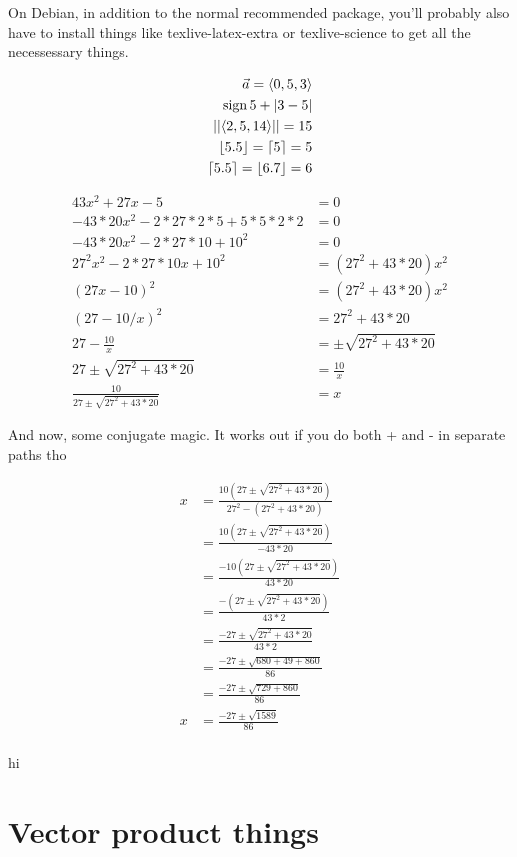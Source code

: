 \documentclass{article}
\DeclareMathOperator{\sgn}{sign}
\DeclarePairedDelimiter\abs{\lvert}{\rvert}
\DeclarePairedDelimiter\magn{\lvert\lvert}{\rvert\rvert}
\DeclarePairedDelimiter\ceil{\lceil}{\rceil}
\DeclarePairedDelimiter\floor{\lfloor}{\rfloor}
\DeclarePairedDelimiter\vecnum{\langle}{\rangle}
\begin{document}
On Debian, in addition to the normal recommended package, you'll probably also have to install things like texlive-latex-extra or texlive-science to get all the necessessary things.

\begin{align*}
  \vec a=\vecnum{0,5,3}\\
  \sgn 5+\abs{3-5}\\
  \magn{\vecnum{2,5,14}}=15\\
  \floor{5.5}=\ceil{5}=5\\
  \ceil{5.5}=\floor{6.7}=6
\end{align*}

\begin{align*}
43x^2+27x-5&=0\\
-43*20x^2-2*27*2*5+5*5*2*2&=0\\
-43*20x^2-2*27*10+10^2&=0\\
27^2x^2-2*27*10x+10^2&=(27^2+43*20)x^2\\
(27x-10)^2&=(27^2+43*20)x^2\\
(27-10/x)^2&=27^2+43*20\\
27-\frac{10}x&=\pm\sqrt{27^2+43*20}\\
27\pm\sqrt{27^2+43*20}&=\frac{10}x\\
\frac{10}{27\pm\sqrt{27^2+43*20}}&=x
\end{align*}

And now, some conjugate magic.  It works out if you do both + and - in separate paths tho

\begin{align*}
x&=\frac{10(27\pm\sqrt{27^2+43*20})}{27^2-(27^2+43*20)}\\
&=\frac{10(27\pm\sqrt{27^2+43*20})}{-43*20}\\
&=\frac{-10(27\pm\sqrt{27^2+43*20})}{43*20}\\
&=\frac{-(27\pm\sqrt{27^2+43*20})}{43*2}\\
&=\frac{-27\pm\sqrt{27^2+43*20}}{43*2}\\
&=\frac{-27\pm\sqrt{680+49+860}}{86}\\
&=\frac{-27\pm\sqrt{729+860}}{86}\\
x&=\frac{-27\pm\sqrt{1589}}{86}\\
\end{align*}

\begin{stonk}
hi
\end{stonk}

\section*{Vector product things}
\end{document}
